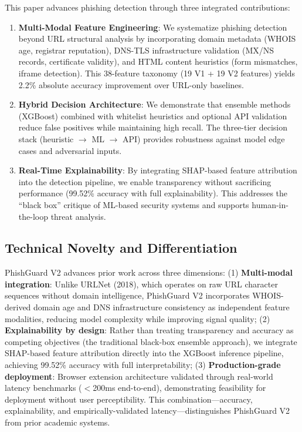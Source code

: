\documentclass[conference]{IEEEtran}
\begin{document}
This paper advances phishing detection through three integrated contributions:

\begin{enumerate}
\item \textbf{Multi-Modal Feature Engineering}: We systematize phishing detection beyond URL structural analysis by incorporating domain metadata (WHOIS age, registrar reputation), DNS-TLS infrastructure validation (MX/NS records, certificate validity), and HTML content heuristics (form mismatches, iframe detection). This 38-feature taxonomy (19 V1 + 19 V2 features) yields 2.2\% absolute accuracy improvement over URL-only baselines.

\item \textbf{Hybrid Decision Architecture}: We demonstrate that ensemble methods (XGBoost) combined with whitelist heuristics and optional API validation reduce false positives while maintaining high recall. The three-tier decision stack (heuristic $\to$ ML $\to$ API) provides robustness against model edge cases and adversarial inputs.

\item \textbf{Real-Time Explainability}: By integrating SHAP-based feature attribution into the detection pipeline, we enable transparency without sacrificing performance (99.52\% accuracy with full explainability). This addresses the ``black box'' critique of ML-based security systems and supports human-in-the-loop threat analysis.
\end{enumerate}

\subsection{Technical Novelty and Differentiation}

PhishGuard V2 advances prior work across three dimensions: (1) \textbf{Multi-modal integration}: Unlike URLNet (2018), which operates on raw URL character sequences without domain intelligence, PhishGuard V2 incorporates WHOIS-derived domain age and DNS infrastructure consistency as independent feature modalities, reducing model complexity while improving signal quality; (2) \textbf{Explainability by design}: Rather than treating transparency and accuracy as competing objectives (the traditional black-box ensemble approach), we integrate SHAP-based feature attribution directly into the XGBoost inference pipeline, achieving 99.52\% accuracy with full interpretability; (3) \textbf{Production-grade deployment}: Browser extension architecture validated through real-world latency benchmarks ($<$200ms end-to-end), demonstrating feasibility for deployment without user perceptibility. This combination—accuracy, explainability, and empirically-validated latency—distinguishes PhishGuard V2 from prior academic systems.
\end{document}
